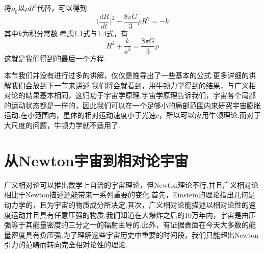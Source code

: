 \documentclass[a4paper]{book}
\begin{document}
将$\rho_0$以$\rho R^3$代替，可以得到
\begin{equation}
\Big(\frac{dR}{dt}\Big)^2-\frac{8\pi G}{3}\rho R^2=-k
\end{equation}
其中$k$为积分常数.考虑\hyperref[1.1]{1.1}式与\hyperref[1.4]{1.4}式，有
\begin{equation}\label{1.21}
	H^2+\frac{k}{a^2}=\frac{8\pi G}{3}\rho
\end{equation}
这就是我们得到的最后一个方程.\par 
本节我们并没有进行过多的讲解，仅仅是推导出了一些基本的公式.更多详细的讲解我们会放到下一节来讲述.我们将会就看到，用牛顿力学得到的结果，与广义相对论的结果基本相同，这归功于宇宙学原理.宇宙学原理告诉我们，宇宙各个局部的运动状态都是一样的，因此我们可以在一个足够小的局部范围内来研究宇宙膨胀运动.在小范围内，星体的相对运动速度小于光速$c$，所以可以应用牛顿理论.而对于大尺度的问题，牛顿力学就不适用了.
\section{从Newton宇宙到相对论宇宙}
广义相对论可以推出数学上自洽的宇宙理论，但Newton理论不行.并且广义相对论相比于Newton描述还能带来一系列重要的变化.首先，Einstein的理论指出几何是动力学的，且为宇宙的物质成分所决定.其次，广义相对论能描述以相对论性的速度运动并且具有任意压强的物质.我们知道在大爆炸之后的10万年内，宇宙是由压强等于其能量密度的三分之一的辐射主导的.此外，有证据表面在今天大多数的能量密度具有负压强.为了理解这些宇宙历史中重要的时间段，我们只能超出Newton引力的范畴而转向完全相对论性的理论.
\end{document}
